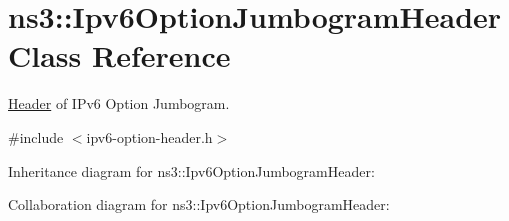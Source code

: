 \hypertarget{classns3_1_1Ipv6OptionJumbogramHeader}{}\section{ns3\+:\+:Ipv6\+Option\+Jumbogram\+Header Class Reference}
\label{classns3_1_1Ipv6OptionJumbogramHeader}


\hyperlink{classns3_1_1Header}{Header} of I\+Pv6 Option Jumbogram.  




{\ttfamily \#include $<$ipv6-\/option-\/header.\+h$>$}



Inheritance diagram for ns3\+:\+:Ipv6\+Option\+Jumbogram\+Header\+:


Collaboration diagram for ns3\+:\+:Ipv6\+Option\+Jumbogram\+Header\+:
